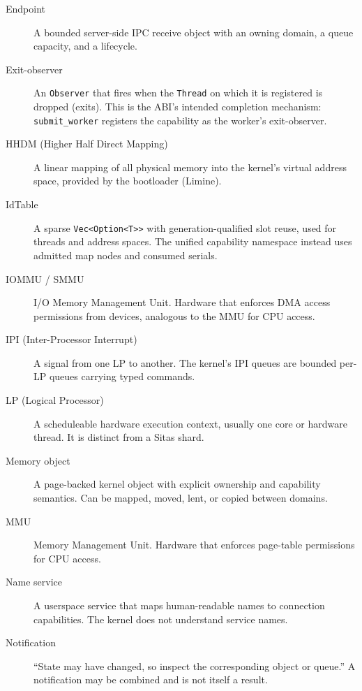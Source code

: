 \begin{description}
    \item[Endpoint] A bounded server-side IPC receive object with an owning
        domain, a queue capacity, and a lifecycle.

    \item[Exit-observer] An \texttt{Observer} that fires when the
        \texttt{Thread} on which it is registered is dropped (exits).
        This is the ABI's intended completion mechanism:
        \texttt{submit\_worker} registers the capability as the worker's
        exit-observer.

    \item[HHDM (Higher Half Direct Mapping)] A linear mapping of all physical
        memory into the kernel's virtual address space, provided by the
        bootloader (Limine).

    \item[IdTable] A sparse \texttt{Vec<Option<T>{>}} with generation-qualified
        slot reuse, used for threads and address spaces. The unified capability
        namespace instead uses admitted map nodes and consumed serials.

    \item[IOMMU / SMMU] I/O Memory Management Unit. Hardware that enforces DMA
        access permissions from devices, analogous to the MMU for CPU access.

    \item[IPI (Inter-Processor Interrupt)] A signal from one LP to another.
        The kernel's IPI queues are bounded per-LP queues carrying typed
        commands.

    \item[LP (Logical Processor)] A scheduleable hardware execution context,
        usually one core or hardware thread. It is distinct from a Sitas shard.

    \item[Memory object] A page-backed kernel object with explicit ownership
        and capability semantics. Can be mapped, moved, lent, or copied between
        domains.

    \item[MMU] Memory Management Unit. Hardware that enforces page-table
        permissions for CPU access.

    \item[Name service] A userspace service that maps human-readable names to
        connection capabilities. The kernel does not understand service names.

    \item[Notification] ``State may have changed, so inspect the corresponding
        object or queue.'' A notification may be combined and is not itself
        a result.


\end{description}
